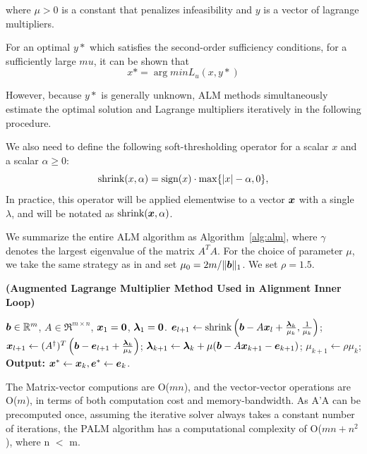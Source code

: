 \documentclass[10pt,twocolumn,letterpaper]{article}
\begin{document}
where $\mu > 0$ is a constant that penalizes infeasibility and $y$ is a vector of lagrange multipliers.

For an optimal $y*$ which satisfies the second-order sufficiency conditions, for a sufficiently large $mu$, it can be shown that
\begin{equation}
x* = \arg min L_u(x,y*)
\end{equation}

However, because $y*$ is generally unknown, ALM methods simultaneously estimate the optimal solution and Lagrange multipliers iteratively in the following procedure.


We also need to define the following soft-thresholding operator for a
scalar $x$ and a scalar $\alpha \geq 0$:
\begin{equation}
\textup{shrink}(x,\alpha) = \textup{sign}(x)\cdot \max \{|x| - \alpha, 0\},
\end{equation}
In practice, this operator will be applied elementwise to a vector ${\boldsymbol{x}}$ with a single $\lambda$,
and will be notated as $\textup{shrink}({\boldsymbol{x}},\alpha)$.


We summarize the entire ALM
algorithm as Algorithm~\ref{alg:alm}, where $\gamma$ denotes the largest eigenvalue of the matrix $A^TA$. For the choice of parameter $\mu$, we take the same strategy as
in \cite{YangJ2009-pp} and set $\mu_0 = 2m / \|\boldsymbol{b}\|_1$. We set $\rho=1.5$.
\begin{algorithm}[h]
\caption{\bf (Augmented Lagrange Multiplier Method Used in Alignment Inner Loop)}
\begin{algorithmic}[1]
 $\boldsymbol{b} \in \mathbb R^m$, $A \in \Re^{m \times n}$,
${\boldsymbol{x}}_1 = \boldsymbol{0}$, $\boldsymbol{\lambda}_1 = \boldsymbol{0}$.
\STATE $\boldsymbol{e}_{l+1} \leftarrow \textup{shrink}\left(\boldsymbol{b} - A{\boldsymbol{x}}_l + \frac{\boldsymbol{\lambda}_k}{\mu_k}, \frac{1}{\mu_k}\right)$;
\STATE ${\boldsymbol{x}}_{l+1} \leftarrow (A^\dagger)^T \left(\boldsymbol{b} - \boldsymbol{e}_{l+1} + \frac{\boldsymbol{\lambda}_k}{\mu_k} \right) $;
\ENDWHILE
\STATE $\boldsymbol{\lambda}_{k+1} \leftarrow \boldsymbol{\lambda}_k + \mu (\boldsymbol{b} - A{\boldsymbol{x}}_{k+1} - \boldsymbol{e}_{k+1})$;
\STATE $\mu_{k+1} \leftarrow \rho\mu_k$;
\ENDWHILE \STATE
{\bf Output:} ${\boldsymbol{x}}^* \leftarrow {\boldsymbol{x}}_k, \boldsymbol{e}^* \leftarrow \boldsymbol{e}_k$.
\end{algorithmic}
\label{alg:alm}
\end{algorithm}


The Matrix-vector computions are O($mn$), and the vector-vector operations are O($m$), 
in terms of both computation cost and memory-bandwidth.  As A'A can be precomputed once, assuming the iterative solver always takes a constant number of iterations, the PALM algorithm has a computational complexity of O($mn+n^2$), where n $<$ m.
\end{document}
